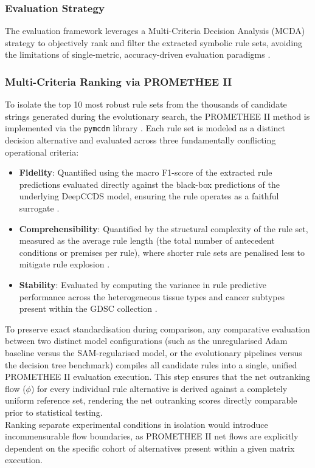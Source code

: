 \subsubsection{Evaluation Strategy}
\label{ssub:method_evaluation_strategy}
The evaluation framework leverages a Multi-Criteria Decision Analysis (MCDA) strategy 
to objectively rank and filter the extracted symbolic rule sets, avoiding the 
limitations of single-metric, accuracy-driven evaluation paradigms \cite{Matejova2025}.

\subsubsection{Multi-Criteria Ranking via PROMETHEE II}
\label{ssub:method_promethee}
To isolate the top 10 most robust rule sets from the thousands of candidate strings 
generated during the evolutionary search, the PROMETHEE II method is implemented via 
the \texttt{pymcdm} library \cite{Yedjour2024}. Each rule set is modeled as a distinct 
decision alternative and evaluated across three fundamentally conflicting operational 
criteria:
\begin{itemize}
    \item \textbf{Fidelity}: Quantified using the macro F1-score of the extracted rule 
    predictions evaluated directly against the black-box predictions of the underlying 
    DeepCCDS model, ensuring the rule operates as a faithful surrogate \cite{Guidotti2021}.
    \item \textbf{Comprehensibility}: Quantified by the structural complexity of the 
    rule set, measured as the average rule length (the total number of antecedent 
    conditions or premises per rule), where shorter rule sets are penalised less to 
    mitigate rule explosion \cite{Yedjour2024}.
    \item \textbf{Stability}: Evaluated by computing the variance in rule predictive 
    performance across the heterogeneous tissue types and cancer subtypes present within 
    the GDSC collection \cite{Ye2024}.
\end{itemize}
\noindent
To preserve exact standardisation during comparison, any comparative evaluation between 
two distinct model configurations (such as the unregularised Adam baseline versus the 
SAM-regularised model, or the evolutionary pipelines versus the decision tree benchmark) 
compiles all candidate rules into a single, unified PROMETHEE II evaluation execution. 
This step ensures that the net outranking flow ($\phi$) for every individual rule 
alternative is derived against a completely uniform reference set, rendering the net 
outranking scores directly comparable prior to statistical testing. 
\\
Ranking separate experimental conditions in isolation would introduce incommensurable 
flow boundaries, as PROMETHEE II net flows are explicitly dependent on the specific 
cohort of alternatives present within a given matrix execution.

